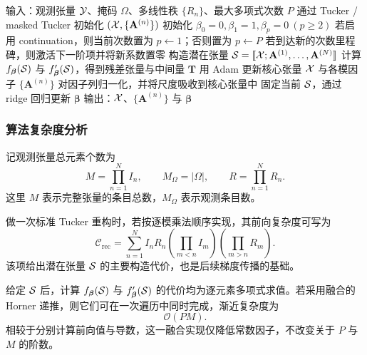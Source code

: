 \begin{algorithm}[t]
\caption{基于交替优化与次数延续的 NTD-PL}
\label{alg:ntdpl}
\begin{algorithmic}[1]
\State 输入：观测张量 $\mathcal{Y}$、掩码 $\Omega$、多线性秩 $\{R_n\}$、最大多项式次数 $P$
\State 通过 Tucker / masked Tucker 初始化 $(\mathcal{X},\{\mathbf A^{(n)}\})$
\State 初始化 $\beta_0=0,\beta_1=1,\beta_p=0\ (p\ge 2)$
\State 若启用 continuation，则当前次数置为 $p\leftarrow 1$；否则置为 $p\leftarrow P$
    \State 若到达新的次数里程碑，则激活下一阶项并将新系数置零
    \State 构造潜在张量 $\mathcal{S}=\llbracket \mathcal{X};\mathbf A^{(1)},\dots,\mathbf A^{(N)}\rrbracket$
    \State 计算 $f_{\boldsymbol\beta}(\mathcal{S})$ 与 $f'_{\boldsymbol\beta}(\mathcal{S})$，得到残差张量与中间量 $\mathbf T$
    \State 用 Adam 更新核心张量 $\mathcal{X}$ 与各模因子 $\{\mathbf A^{(n)}\}$
    \State 对因子列归一化，并将尺度吸收到核心张量中
        \State 固定当前 $\mathcal{S}$，通过 ridge 回归更新 $\boldsymbol\beta$
    \EndIf
\EndFor
\State 输出：$\mathcal{X}$、$\{\mathbf A^{(n)}\}$ 与 $\boldsymbol\beta$
\end{algorithmic}
\end{algorithm}

\subsubsection{算法复杂度分析}

记观测张量总元素个数为
\begin{equation}
M = \prod_{n=1}^{N} I_n,
\qquad
M_\Omega = |\Omega|,
\qquad
R=\prod_{n=1}^{N}R_n.
\end{equation}
这里 $M$ 表示完整张量的条目总数，$M_\Omega$ 表示观测条目数。

做一次标准 Tucker 重构时，若按逐模乘法顺序实现，其前向复杂度可写为
\begin{equation}
\mathcal C_{\mathrm{rec}}
=
\sum_{n=1}^{N}
I_nR_n
\left(\prod_{m<n} I_m\right)
\left(\prod_{m>n} R_m\right).
\label{eq:tucker_reconstruction_complexity}
\end{equation}
该项给出潜在张量 $\mathcal{S}$ 的主要构造代价，也是后续梯度传播的基础。

给定 $\mathcal{S}$ 后，计算 $f_{\boldsymbol\beta}(\mathcal{S})$ 与 $f'_{\boldsymbol\beta}(\mathcal{S})$ 的代价均为逐元素多项式求值。若采用融合的 Horner 递推，则它们可在一次遍历中同时完成，渐近复杂度为
\begin{equation}
\mathcal O(PM).
\end{equation}
相较于分别计算前向值与导数，这一融合实现仅降低常数因子，不改变关于 $P$ 与 $M$ 的阶数。


